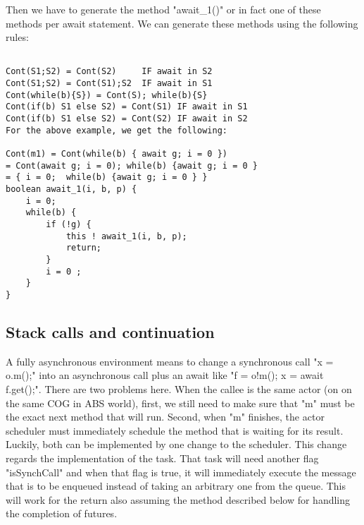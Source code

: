 Then we have to generate the method "await\_1()" or in fact one of these methods per await statement. We can generate these methods using the following rules:


\begin{lstlisting}

Cont(S1;S2) = Cont(S2)     IF await in S2
Cont(S1;S2) = Cont(S1);S2  IF await in S1
Cont(while(b){S}) = Cont(S); while(b){S}
Cont(if(b) S1 else S2) = Cont(S1) IF await in S1
Cont(if(b) S1 else S2) = Cont(S2) IF await in S2
For the above example, we get the following:

Cont(m1) = Cont(while(b) { await g; i = 0 })
= Cont(await g; i = 0); while(b) {await g; i = 0 }
= { i = 0;  while(b) {await g; i = 0 } }
boolean await_1(i, b, p) {
	i = 0;  
	while(b) {
		if (!g) {
			this ! await_1(i, b, p);
			return;
		}
		i = 0 ;
	}
}
\end{lstlisting}

\subsection{Stack calls and continuation}
A fully asynchronous environment means to change a synchronous call "x = o.m();" into an asynchronous call plus an await like "f = o!m(); x = await f.get();". There are two problems here. When the callee is the same actor (on on the same COG in ABS world), first, we still need to make sure that "m" must be the exact next method that will run. Second, when "m" finishes, the actor scheduler must immediately schedule the method that is waiting for its result. Luckily, both can be implemented by one change to the scheduler. This change regards the implementation of the task. That task will need another flag "isSynchCall" and when that flag is true, it will immediately execute the message that is to be enqueued instead of taking an arbitrary one from the queue. This will work for the return also assuming the method described below for handling the completion of futures.




